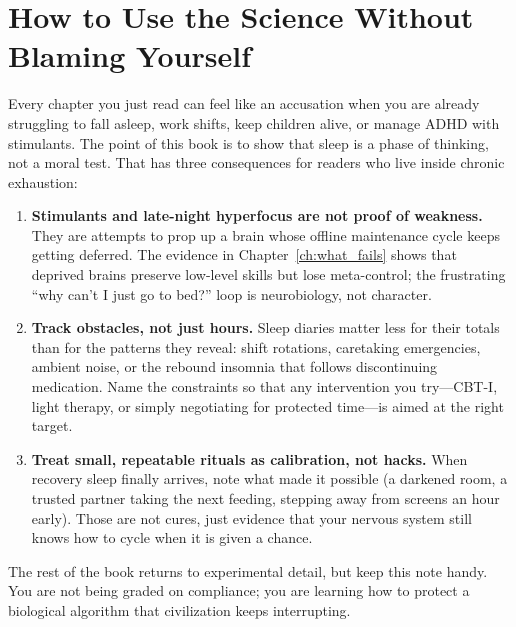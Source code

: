 \section*{How to Use the Science Without Blaming Yourself}\label{sec:note_for_readers_text}
\noindent Every chapter you just read can feel like an accusation when you are already struggling to fall asleep, work shifts,
keep children alive, or manage ADHD with stimulants. The point of this book is to show that sleep is a phase of thinking, not a
moral test. That has three consequences for readers who live inside chronic exhaustion:

\begin{enumerate}
    \item \textbf{Stimulants and late-night hyperfocus are not proof of weakness.} They are attempts to prop up a brain whose
    offline maintenance cycle keeps getting deferred. The evidence in Chapter~\ref{ch:what_fails} shows that deprived brains
    preserve low-level skills but lose meta-control; the frustrating ``why can't I just go to bed?'' loop is neurobiology, not
    character.
    \item \textbf{Track obstacles, not just hours.} Sleep diaries matter less for their totals than for the patterns they reveal:
    shift rotations, caretaking emergencies, ambient noise, or the rebound insomnia that follows discontinuing medication. Name
    the constraints so that any intervention you try---CBT-I, light therapy, or simply negotiating for protected time---is aimed
    at the right target.
    \item \textbf{Treat small, repeatable rituals as calibration, not hacks.} When recovery sleep finally arrives, note what made
    it possible (a darkened room, a trusted partner taking the next feeding, stepping away from screens an hour early). Those are
    not cures, just evidence that your nervous system still knows how to cycle when it is given a chance.
\end{enumerate}

The rest of the book returns to experimental detail, but keep this note handy. You are not being graded on compliance; you are
learning how to protect a biological algorithm that civilization keeps interrupting.
